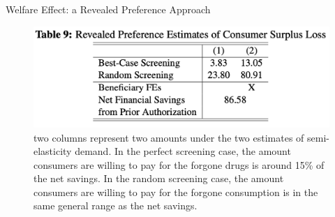 \begin{frame}{Welfare Effect: a Revealed Preference Approach}
    \begin{figure}
        \centering
        \includegraphics[width=0.75\linewidth]{tb9.png}
        \caption{two columns represent two amounts under the two estimates of semi-elasticity demand. In the perfect screening case, the amount consumers are willing to pay for the forgone drugs is around 15\% of the net savings. In the random screening case, the amount consumers are willing to pay for the forgone consumption is in the same general range as the net savings.}
        \label{fig:enter-label}
    \end{figure}
\end{frame}